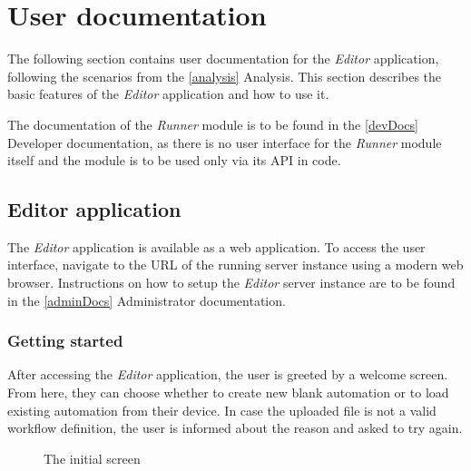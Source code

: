 \section{User documentation} \label{userDocs}

The following section contains user documentation for the \textit{Editor} application, following the scenarios from the \autoref{analysis} Analysis.
This section describes the basic features of the \textit{Editor} application and how to use it.

The documentation of the \textit{Runner} module is to be found in the \autoref{devDocs} Developer documentation, as there is no user interface for the \textit{Runner} module itself and the module is to be used only via its \ac{API} in code.

\subsection{Editor application}

The \textit{Editor} application is available as a web application.
To access the user interface, navigate to the URL of the running server instance using a modern web browser.
Instructions on how to setup the \textit{Editor} server instance are to be found in the \autoref{adminDocs} Administrator documentation.

\subsubsection{Getting started}

After accessing the \textit{Editor} application, the user is greeted by a welcome screen.
From here, they can choose whether to create new blank automation or to load existing automation from their device.
In case the uploaded file is not a valid workflow definition, the user is informed about the reason and asked to try again.

\begin{figure}[!h]
    \begin{center}
    \end{center}
    \caption{The initial screen}
\end{figure}
\clearpage

